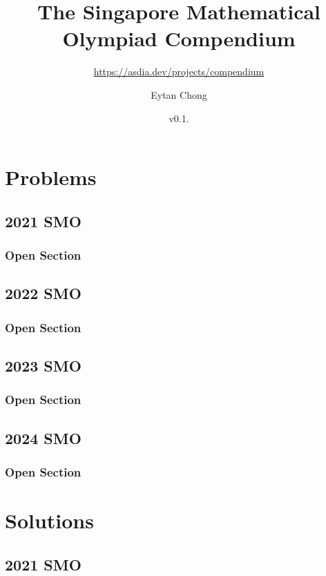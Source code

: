 \documentclass[a4paper, listof=totoc,bibliography=totoc,]{scrbook}
\title{The Singapore Mathematical Olympiad Compendium}
\subtitle{\url{https://asdia.dev/projects/compendium}}
\author{Eytan Chong}
\date{v0.1.\datetwo}
\begin{document}
\maketitle
\tableofcontents



\part{Problems}

\chapter{2021 SMO}
\section{Open Section}


\chapter{2022 SMO}
\section{Open Section}



\chapter{2023 SMO}
\section{Open Section}



\chapter{2024 SMO}
\section{Open Section}



\part{Solutions}

\chapter{2021 SMO}
\end{document}
